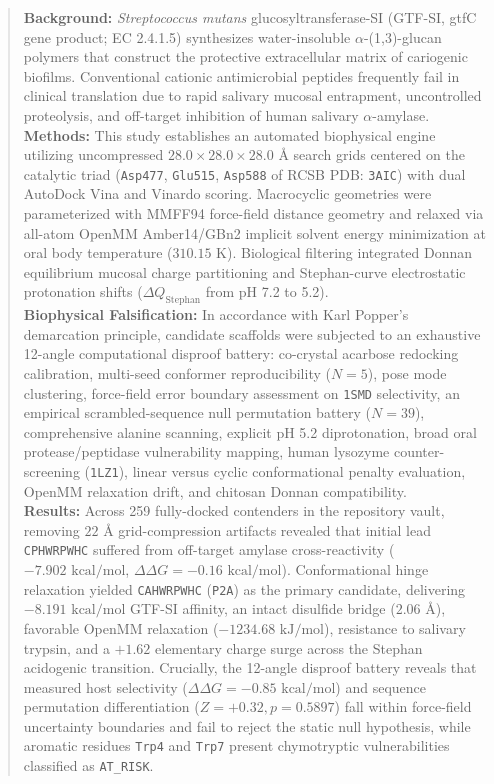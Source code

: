 \documentclass[11pt,a4paper]{article}
\begin{document}
\begin{abstract}
\noindent\textbf{Background:} \textit{Streptococcus mutans} glucosyltransferase-SI (GTF-SI, gtfC gene product; EC 2.4.1.5) synthesizes water-insoluble $\alpha$-(1,3)-glucan polymers that construct the protective extracellular matrix of cariogenic biofilms. Conventional cationic antimicrobial peptides frequently fail in clinical translation due to rapid salivary mucosal entrapment, uncontrolled proteolysis, and off-target inhibition of human salivary $\alpha$-amylase. \\
\textbf{Methods:} This study establishes an automated biophysical engine utilizing uncompressed $28.0 \times 28.0 \times 28.0\text{ \AA}$ search grids centered on the catalytic triad (\texttt{Asp477}, \texttt{Glu515}, \texttt{Asp588} of RCSB PDB: \texttt{3AIC}) with dual AutoDock Vina and Vinardo scoring. Macrocyclic geometries were parameterized with MMFF94 force-field distance geometry and relaxed via all-atom OpenMM Amber14/GBn2 implicit solvent energy minimization at oral body temperature ($310.15\text{ K}$). Biological filtering integrated Donnan equilibrium mucosal charge partitioning and Stephan-curve electrostatic protonation shifts ($\Delta Q_{\text{Stephan}}$ from pH 7.2 to 5.2). \\
\textbf{Biophysical Falsification:} In accordance with Karl Popper's demarcation principle, candidate scaffolds were subjected to an exhaustive 12-angle computational disproof battery: co-crystal acarbose redocking calibration, multi-seed conformer reproducibility ($N=5$), pose mode clustering, force-field error boundary assessment on \texttt{1SMD} selectivity, an empirical scrambled-sequence null permutation battery ($N=39$), comprehensive alanine scanning, explicit pH 5.2 diprotonation, broad oral protease/peptidase vulnerability mapping, human lysozyme counter-screening (\texttt{1LZ1}), linear versus cyclic conformational penalty evaluation, OpenMM relaxation drift, and chitosan Donnan compatibility. \\
\textbf{Results:} Across 259 fully-docked contenders in the repository vault, removing $22\text{ \AA}$ grid-compression artifacts revealed that initial lead \texttt{CPHWRPWHC} suffered from off-target amylase cross-reactivity ($-7.902\text{ kcal/mol}$, $\Delta\Delta G = -0.16\text{ kcal/mol}$). Conformational hinge relaxation yielded \texttt{CAHWRPWHC} (\texttt{P2A}) as the primary candidate, delivering $-8.191\text{ kcal/mol}$ GTF-SI affinity, an intact disulfide bridge ($2.06\text{ \AA}$), favorable OpenMM relaxation ($-1234.68\text{ kJ/mol}$), resistance to salivary trypsin, and a $+1.62$ elementary charge surge across the Stephan acidogenic transition. Crucially, the 12-angle disproof battery reveals that measured host selectivity ($\Delta\Delta G = -0.85\text{ kcal/mol}$) and sequence permutation differentiation ($Z = +0.32, p = 0.5897$) fall within force-field uncertainty boundaries and fail to reject the static null hypothesis, while aromatic residues \texttt{Trp4} and \texttt{Trp7} present chymotryptic vulnerabilities classified as \texttt{AT\_RISK}. \\

\end{abstract}
\end{document}
